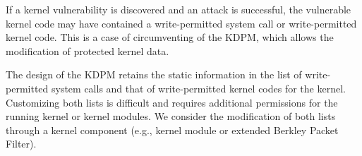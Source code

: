 If a kernel vulnerability is discovered and an attack is successful, the
vulnerable kernel code may have contained a write-permitted system call or
write-permitted kernel code. This is a case of circumventing of the KDPM, which
allows the modification of protected kernel data.

The design of the KDPM retains the static information in the list of write-permitted system
calls and that of write-permitted kernel codes for the kernel. %
Customizing both lists is difficult and requires additional permissions for the
running kernel or kernel modules. We consider the modification of both lists
through a kernel component (e.g., kernel module or extended Berkley Packet
Filter). 

 





